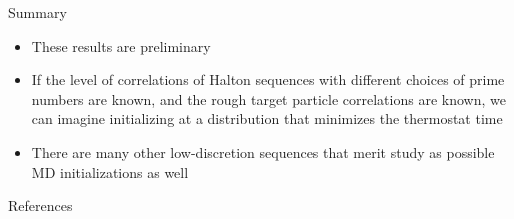\documentclass{beamer}
\begin{document}
	\begin{frame}{Summary}
	\begin{itemize}
	\item These results are preliminary
	\vspace{1em}
	\item If the level of correlations of Halton sequences with different choices of prime numbers are known, and the rough target particle correlations are known, we can imagine initializing at a distribution that minimizes the thermostat time\vspace{1em}
	\item There are many other low-discretion sequences that merit study as possible MD initializations as well
	\end{itemize}
	
	\end{frame}
	
	\begin{frame}{References}
	\nocite{*}
		
	\end{frame}
\end{document}
